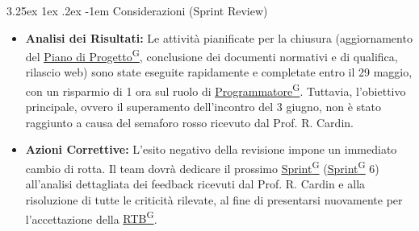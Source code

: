 \documentclass[a4paper,12pt]{article}
\makeatletter
\renewcommand\paragraph{\@startsection{paragraph}{5}{\z@}%
  {3.25ex \@plus1ex \@minus.2ex}%
  {-1em}%
  {\normalfont\normalsize\bfseries}}
\providecommand{\glslink}[2]{\href{https://alittlebyte-19.github.io/Documentazione/glossario.html\#gls-#1}{\underline{#2}\textsuperscript{\scriptsize G}}}
\makeatother
\begin{document}
\paragraph{Considerazioni (Sprint Review)}
\begin{itemize}
    \item \textbf{Analisi dei Risultati:} Le attività pianificate per la chiusura (aggiornamento del \glslink{piano-di-progetto}{Piano di Progetto}, conclusione dei documenti normativi e di qualifica, rilascio web) sono state eseguite rapidamente e completate entro il 29 maggio, con un risparmio di 1 ora sul ruolo di \glslink{programmatore}{Programmatore}. Tuttavia, l'obiettivo principale, ovvero il superamento dell'incontro del 3 giugno, non è stato raggiunto a causa del semaforo rosso ricevuto dal Prof. R. Cardin.
    \item \textbf{Azioni Correttive:} L'esito negativo della revisione impone un immediato cambio di rotta. Il team dovrà dedicare il prossimo \glslink{sprint}{Sprint} (\glslink{sprint}{Sprint} 6) all'analisi dettagliata dei feedback ricevuti dal Prof. R. Cardin e alla risoluzione di tutte le criticità rilevate, al fine di presentarsi nuovamente per l'accettazione della \glslink{rtb-requirements-and-technology-baseline}{RTB}.
\end{itemize}
\end{document}
